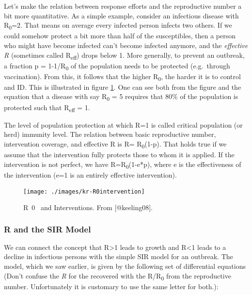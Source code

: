 \documentclass[
]{book}
\begin{document}
Let's make the relation between response efforts and the reproductive number a bit more quantitative. As a simple example, consider an infectious disease with R\textsubscript{0}=2. That means on average every infected person infects two others. If we could somehow protect a bit more than half of the susceptibles, then a person who might have become infected can't become infected anymore, and the \emph{effective R} (sometimes called R\textsubscript{eff}) drops below 1. More generally, to prevent an outbreak, a fraction p = 1-1/R\textsubscript{0} of the population needs to be protected (e.g.~through vaccination). From this, it follows that the higher R\textsubscript{0}, the harder it is to control and ID. This is illustrated in figure \ref{fig:krR0intervention}. One can see both from the figure and the equation that a disease with say R\textsubscript{0} = 5 requires that 80\% of the population is protected such that R\textsubscript{eff} = 1.

The level of population protection at which R=1 is called critical population (or herd) immunity level. The relation between basic reproductive number, intervention coverage, and effective R is R= R\textsubscript{0}(1-p). That holds true if we assume that the intervention fully protects those to whom it is applied. If the intervention is not perfect, we have R=R\textsubscript{0}(1-e*p), where e is the effectiveness of the intervention (e=1 is an entirely effective intervention).

\begin{figure}
\texttt{[image: ./images/kr-R0intervention]} \caption{R~0~ and Interventions. From [@keeling08].}\label{fig:krR0intervention}
\end{figure}

\hypertarget{myadvancedbox}{%
\subsubsection{R and the SIR Model}\label{myadvancedbox}}

We can connect the concept that R\textgreater1 leads to growth and R\textless1 leads to a decline in infectious persons with the simple SIR model for an outbreak. The model, which we saw earlier, is given by the following set of differential equations (Don't confuse the \emph{R} for the recovered with the R/R\textsubscript{0} from the reproductive number. Unfortunately it is customary to use the same letter for both.):
\end{document}
